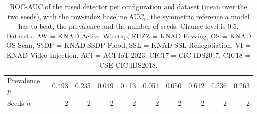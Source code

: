 \begin{table}[t]
\begin{tabular}{@{}lrrrrrrrrr@{}}
  Prevalence $p$ & 0.493 & 0.235 & 0.049 & 0.413 & 0.051 & 0.050 & 0.612 & 0.236 & 0.263 \\
  Seeds $n$ & 2 & 2 & 2 & 2 & 2 & 2 & 2 & 2 & 2 \\
  \bottomrule
  \end{tabular}
  \caption{ROC-AUC of the fused detector per configuration and dataset (mean over the two seeds), with the row-index baseline AUC$_t$, the symmetric reference a model has to beat, the prevalence and the number of seeds. Chance level is 0.5. Datasets: AW = KNAD Active Wiretap, FUZZ = KNAD Fuzzing, OS = KNAD OS Scan, SSDP = KNAD SSDP Flood, SSL = KNAD SSL Renegotiation, VI = KNAD Video Injection, ACI = ACI-IoT-2023, CIC17 = CIC-IDS2017, CIC18 = CSE-CIC-IDS2018.}
  \label{tab:main-results-compact}
\end{table}

